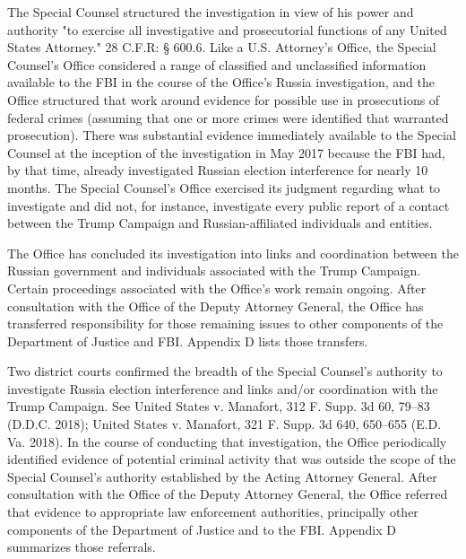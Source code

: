 The Special Counsel structured the investigation in view of his power and authority "to exercise all investigative and prosecutorial functions of any United States Attorney." 28 C.F.R: § 600.6. Like a U.S. Attorney's Office, the Special Counsel's Office considered a range of classified and unclassified information available to the FBI in the course of the Office's Russia investigation, and the Office structured that work around evidence for possible use in prosecutions of federal crimes (assuming that one or more crimes were identified that warranted prosecution).
There was substantial evidence immediately available to the Special Counsel at the inception of the investigation in May 2017 because the FBI had, by that time, already investigated Russian election interference for nearly 10 months.
The Special Counsel's Office exercised its judgment regarding what to investigate and did not, for instance, investigate every public report of a contact between the Trump Campaign and Russian-affiliated individuals and entities.

The Office has concluded its investigation into links and coordination between the Russian government and individuals associated with the Trump Campaign.
Certain proceedings associated with the Office's work remain ongoing.
After consultation with the Office of the Deputy Attorney General, the Office has transferred responsibility for those remaining issues to other components of the Department of Justice and FBI.
Appendix D lists those transfers.

Two district courts confirmed the breadth of the Special Counsel's authority to investigate Russia election interference and links and/or coordination with the Trump Campaign.
See United States v. Manafort, 312 F. Supp. 3d 60, 79--83 (D.D.C. 2018); United States v. Manafort, 321 F. Supp. 3d 640, 650--655 (E.D. Va. 2018).
In the course of conducting that investigation, the Office periodically identified evidence of potential criminal activity that was outside the scope of the Special Counsel's authority established by the Acting Attorney General.
After consultation with the Office of the Deputy Attorney General, the Office referred that evidence to appropriate law enforcement authorities, principally other components of the Department of Justice and to the FBI.
Appendix D summarizes those referrals.

\hr

